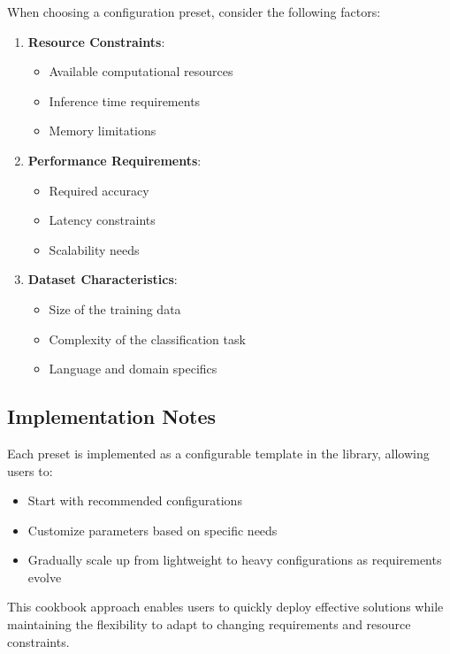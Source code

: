When choosing a configuration preset, consider the following factors:

\begin{enumerate}
    \item \textbf{Resource Constraints}:
    \begin{itemize}
        \item Available computational resources
        \item Inference time requirements
        \item Memory limitations
    \end{itemize}
    
    \item \textbf{Performance Requirements}:
    \begin{itemize}
        \item Required accuracy
        \item Latency constraints
        \item Scalability needs
    \end{itemize}
    
    \item \textbf{Dataset Characteristics}:
    \begin{itemize}
        \item Size of the training data
        \item Complexity of the classification task
        \item Language and domain specifics
    \end{itemize}
\end{enumerate}

\subsection{Implementation Notes}

Each preset is implemented as a configurable template in the library, allowing users to:
\begin{itemize}
    \item Start with recommended configurations
    \item Customize parameters based on specific needs
    \item Gradually scale up from lightweight to heavy configurations as requirements evolve
\end{itemize}

This cookbook approach enables users to quickly deploy effective solutions while maintaining the flexibility to adapt to changing requirements and resource constraints.

